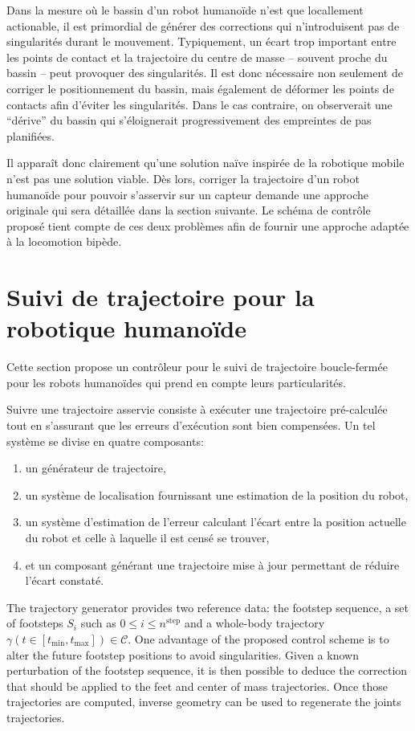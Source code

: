 Dans la mesure où le bassin d'un robot humanoïde n'est que locallement
actionable, il est primordial de générer des corrections qui
n'introduisent pas de singularités durant le mouvement. Typiquement,
un écart trop important entre les points de contact et la trajectoire
du centre de masse -- souvent proche du bassin -- peut provoquer des
singularités. Il est donc nécessaire non seulement de corriger le
positionnement du bassin, mais également de déformer les points de
contacts afin d'éviter les singularités. Dans le cas contraire, on
observerait une ``dérive'' du bassin qui s'éloignerait progressivement
des empreintes de pas planifiées.

Il apparaît donc clairement qu'une solution naïve inspirée de la
robotique mobile n'est pas une solution viable. Dès lors, corriger la
trajectoire d'un robot humanoïde pour pouvoir s'asservir sur un
capteur demande une approche originale qui sera détaillée dans la
section suivante. Le schéma de contrôle proposé tient compte de ces
deux problèmes afin de fournir une approche adaptée à la locomotion
bipède.

\section{Suivi de trajectoire pour la robotique humanoïde}\label{closedloop}


Cette section propose un contrôleur pour le suivi de trajectoire
boucle-fermée pour les robots humanoïdes qui prend en compte leurs
particularités.

Suivre une trajectoire asservie consiste à exécuter une trajectoire
pré-calculée tout en s'assurant que les erreurs d'exécution sont bien
compensées. Un tel système se divise en quatre composants:

\begin{enumerate}
\item un générateur de trajectoire,
\item un système de localisation fournissant une estimation de la position du robot,
\item un système d'estimation de l'erreur calculant l'écart entre la
  position actuelle du robot et celle à laquelle il est censé se
  trouver,
\item et un composant générant une trajectoire mise à jour permettant
  de réduire l'écart constaté.
\end{enumerate}


The trajectory generator provides two reference data: the footstep
sequence, a set of footsteps $S_i$ such as \mbox{$0 \leq i \leq
  n^{\text{step}}$} and a whole-body trajectory \mbox{$\gamma(t \in
  [t_{\text{min}}, t_{\text{max}}]) \in \mathcal{C}$}. One advantage
of the proposed control scheme is to alter the future footstep
positions to avoid singularities. Given a known perturbation of the
footstep sequence, it is then possible to deduce the correction that
should be applied to the feet and center of mass trajectories. Once
those trajectories are computed, inverse geometry can be used to
regenerate the joints trajectories.


